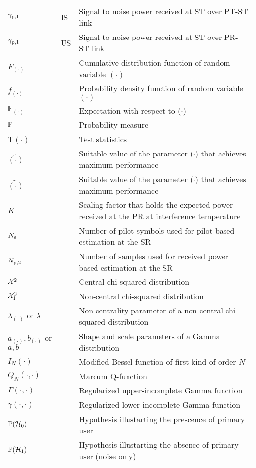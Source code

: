 \begin{longtable}{p{}p{}p{}}
	${\gamma}_{\text{p,1}}$  		& IS &		Signal to noise power received at ST over PT-ST link \\ 
	${\gamma}_{\text{p,1}}$  		& US &		Signal to noise power received at ST over PR-ST link \\ 
       $F_{(\cdot)}$            & &          Cumulative distribution function of random variable $(\cdot)$ \\
       $f_{(\cdot)}$            & &          Probability density function of random variable $(\cdot)$ \\
       $\mathbb E_{(\cdot)}$    & &		Expectation with respect to ($\cdot$) \\
       $\mathbb P$                     & &     	Probability measure \\
       T$(\cdot)$  	        & &          Test statistics \\
       $\tilde{(\cdot)}$        & &		Suitable value of the parameter ($\cdot$) that achieves maximum performance \\
       $\tilde{(\cdot)}$        & &		Suitable value of the parameter ($\cdot$) that achieves maximum performance \\
       $K$                      & &      Scaling factor that holds the expected power received at the PR at interference temperature  \\
       $N_{\text{s}}$                    & &      Number of pilot symbols used for pilot based estimation at the SR \\
       $N_{\text{p,2}}$                    & &      Number of samples used for received power based estimation at the SR \\
       $\cchi2$                & &      Central chi-squared distribution \\
       $\ncchi2$                & &      Non-central chi-squared distribution \\
       $\lambda_{(\cdot)}$ or $\lambda$  &     &       Non-centrality parameter of a non-central chi-squared distribution \\
       $a_{(\cdot)}, b_{(\cdot)}$ or $a, b$ &  &       Shape and scale parameters of a Gamma distribution \\

       $I_{N}(\cdot)$	        & &	Modified Bessel function of first kind of order $N$ \\		
       $Q_{N}(\cdot, \cdot)$	& &	Marcum Q-function \\		
       $\Gamma(\cdot, \cdot)$	& &	Regularized upper-incomplete Gamma function\\		
       $\gamma(\cdot, \cdot)$	& &	Regularized lower-incomplete Gamma function\\		
       $\mathbb P(\mathcal{H}_0)$			& &	Hypothesis illustarting the prescence of primary user\\	
       $\mathbb P(\mathcal{H}_1)$			& &	Hypothesis illustarting the absence of primary user (noise only) \\		
\end{longtable}
  




